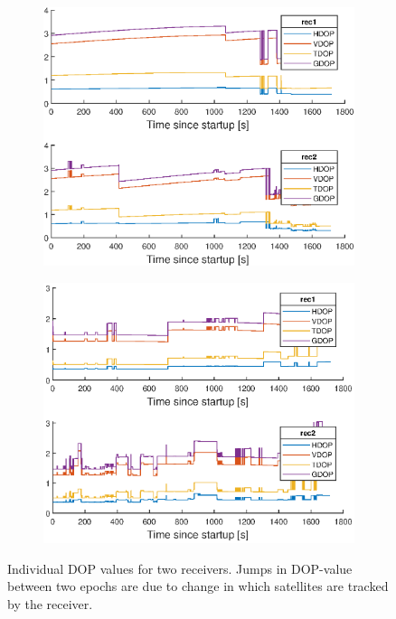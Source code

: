 \begin{figure}[!h]
\centering
\begin{subfigure}{0.8\textwidth}
\includegraphics[width=\textwidth]{Results/DOP_N}
\end{subfigure}
\begin{subfigure}{\textwidth}
\includegraphics[width=\textwidth]{Results/DOP_E}
\end{subfigure}
\caption{Individual DOP values for two receivers. Jumps in DOP-value between two epochs are due to change in which satellites are tracked by the receiver.}
\end{figure}

